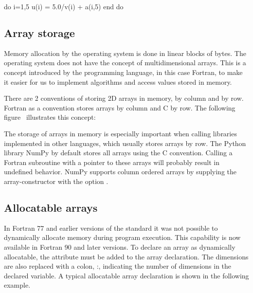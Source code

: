\begin{fortrancodeenv}
do i=1,5
    u(i) = 5.0/v(i) + a(i,5)
end do
\end{fortrancodeenv}

\subsection{Array storage}

Memory allocation by the operating system is done in linear blocks of bytes. The operating system does not have the concept of multidimensional arrays. This is a concept introduced by the programming language, in this case Fortran, to make it easier for us to implement algorithms and access values stored in memory.

There are 2 conventions of storing 2D arrays in memory, by column and by row. Fortran as a convention stores arrays by column and C by row. The following figure~\cite{array_storage} illustrates this concept:


The storage of arrays in memory is especially important when calling libraries implemented in other languages, which usually stores arrays by row. The Python library NumPy by default stores all arrays using the C convention. Calling a Fortran subroutine with a pointer to these arrays will probably result in undefined behavior. NumPy supports column ordered arrays by supplying the array-constructor with the option .

\subsection{Allocatable arrays}

In Fortran 77 and earlier versions of the standard it was not possible to dynamically allocate memory during program execution. This capability is now available in Fortran 90 and later versions. To declare an array as dynamically allocatable, the attribute  must be added to the array declaration. The dimensions are also replaced with a colon, :, indicating the number of dimensions in the declared variable. A typical allocatable array declaration is shown in the following example.


